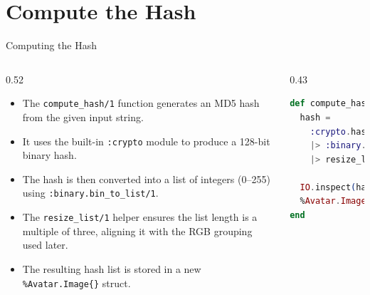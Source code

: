 \documentclass[aspectratio=169, table]{beamer}
\begin{document}
\section{Compute the Hash}
\begin{frame}[fragile]{Computing the Hash}
\vspace{10pt}
\small
\begin{columns}[T,totalwidth=\textwidth]
  \begin{column}{0.52\textwidth}
    \begin{itemize}
      \item The \texttt{compute\_hash/1} function generates an MD5 hash from the given input string.
      \item It uses the built-in \texttt{:crypto} module to produce a 128-bit binary hash.
      \item The hash is then converted into a list of integers (0–255) using \texttt{:binary.bin\_to\_list/1}.
      \item The \texttt{resize\_list/1} helper ensures the list length is a multiple of three, aligning it with the RGB grouping used later.
      \item The resulting hash list is stored in a new \texttt{\%Avatar.Image\{\}} struct.
    \end{itemize}
  \end{column}

  \begin{column}{0.43\textwidth}
    \begin{lstlisting}[language=Elixir, 
      caption={Computing the hash from the input string}, 
      basicstyle=\ttfamily\footnotesize]
def compute_hash(input) do
  hash =
    :crypto.hash(:md5, input)
    |> :binary.bin_to_list()
    |> resize_list

  IO.inspect(hash)
  %Avatar.Image{hash: hash}
end
    \end{lstlisting}
  \end{column}
\end{columns}
\end{frame}
\end{document}
